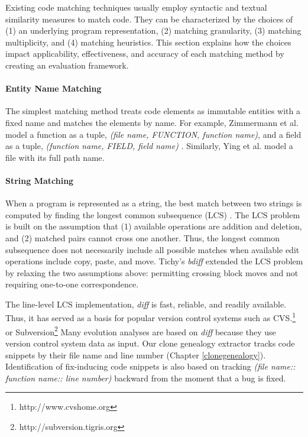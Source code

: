 \documentclass[runningheads,a4paper]{llncs}
\begin{document}
Existing code matching techniques usually employ syntactic and textual similarity measures to match code. They can be characterized by the choices of (1) an underlying program representation, (2) matching granularity, (3) matching multiplicity, and (4) matching heuristics. This section explains how the choices impact applicability, effectiveness, and accuracy of each matching method by creating an evaluation framework. 


\paragraph{Entity Name Matching}
The simplest matching method treats code elements as immutable entities with a fixed name and matches the elements by name. For example, Zimmermann et al. model a function as a tuple, \textit{(file name, FUNCTION, function name)}, and a field as a tuple, \textit{(function name, FIELD, field name)} \cite{Zimmermann2004}. Similarly, Ying et al. \cite{Ying2004} model a file with its full path name. %

\paragraph{String Matching}
When a program is represented as a string, the best match between two strings is computed by finding the longest common subsequence (LCS) \cite{Apostolico1997}. The LCS problem is built on the assumption that (1) available operations are addition and deletion, and (2) matched pairs cannot cross one another. Thus, the longest common subsequence does not necessarily include all possible matches when available edit operations include copy, paste, and move. Tichy's \textit{bdiff} \cite{Tichy1984} extended the LCS problem by relaxing the two assumptions above: permitting crossing block moves and not requiring one-to-one correspondence. 

The line-level LCS implementation, \textit{diff} \cite{Hunt1977} is fast, reliable, and readily available. Thus, it has served as a basis for popular version control systems such as CVS.\footnote{http://www.cvshome.org} or Subversion\footnote{http://subversion.tigris.org} Many evolution analyses are based on {\it diff} because they use version control system data as input. Our clone genealogy extractor tracks code snippets by their file name and line number (Chapter \ref{clonegenealogy}). Identification of fix-inducing code snippets \cite{Sliwerski2005} is also based on tracking \textit{(file name:: function name:: line number)} backward from the moment that a bug is fixed.  
\end{document}
